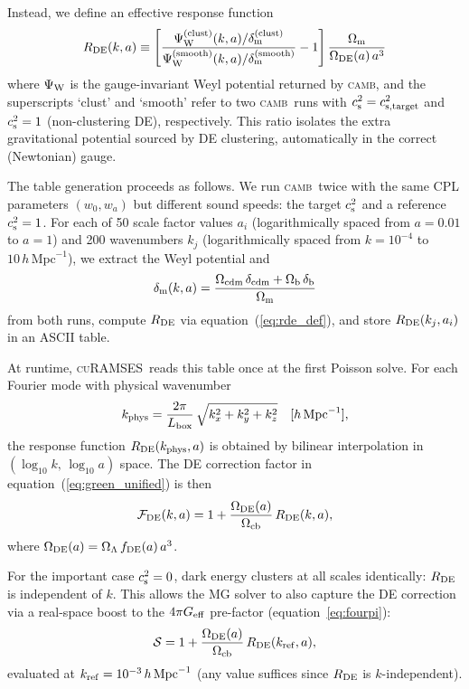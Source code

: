 \documentclass[fleqn,usenatbib]{mnras}
\newcommand{\curamses}{\textsc{cuRAMSES}}
\newcommand{\camb}{\textsc{camb}}
\newcommand{\Ocb}{\Omega_{\rm cb}}
\newcommand{\Om}{\Omega_{\rm m}}
\newcommand{\Ol}{\Omega_\Lambda}
\newcommand{\Ode}{\Omega_{\rm DE}}
\newcommand{\Rde}{R_{\rm DE}}
\newcommand{\cst}{c_{\rm s}^2}
\begin{document}
Instead, we define an effective response function
\begin{equation}
\Rde(k,a) \equiv \left[
  \frac{\Psi_{\rm W}^{(\rm clust)}(k,a) / \delta_{\rm m}^{(\rm clust)}}
       {\Psi_{\rm W}^{(\rm smooth)}(k,a) / \delta_{\rm m}^{(\rm smooth)}}
  - 1
\right]
\frac{\Om}{\Ode(a)\,a^3}
\label{eq:rde_def}
\end{equation}
where $\Psi_{\rm W}$ is the gauge-invariant Weyl potential returned by
\camb, and the superscripts `clust' and `smooth' refer to two \camb\
runs with $\cst = c_{\rm s,target}^2$ and $\cst = 1$ (non-clustering
DE), respectively.  This ratio isolates the extra gravitational
potential sourced by DE clustering, automatically in the correct
(Newtonian) gauge.

The table generation proceeds as follows.  We run \camb\ twice with
the same CPL parameters $(w_0, w_a)$ but different sound speeds:
the target $\cst$ and a reference $\cst=1$.  For each of 50 scale
factor values $a_i$ (logarithmically spaced from $a=0.01$ to $a=1$)
and 200 wavenumbers $k_j$ (logarithmically spaced from $k=10^{-4}$
to $10\,h\,\mathrm{Mpc}^{-1}$), we extract the Weyl potential and
\begin{equation}
\delta_{\rm m}(k,a) = \frac{\Omega_{\rm cdm}\,\delta_{\rm cdm}
  + \Omega_{\rm b}\,\delta_{\rm b}}{\Om}
\label{eq:delta_m}
\end{equation}
from both runs, compute $\Rde$ via equation~(\ref{eq:rde_def}), and
store $\Rde(k_j, a_i)$ in an ASCII table.

At runtime, \curamses\ reads this table once at the first Poisson
solve.  For each Fourier mode with physical wavenumber
\begin{equation}
k_{\rm phys} = \frac{2\pi}{L_{\rm box}}\,
\sqrt{k_x^2 + k_y^2 + k_z^2}
\quad [h\,\mathrm{Mpc}^{-1}],
\label{eq:kphys}
\end{equation}
the response function $\Rde(k_{\rm phys}, a)$ is obtained by bilinear
interpolation in $(\log_{10}k,\,\log_{10}a)$ space.  The DE correction
factor in equation~(\ref{eq:green_unified}) is then
\begin{equation}
\mathcal{F}_{\rm DE}(k,a)
  = 1 + \frac{\Ode(a)}{\Ocb}\,\Rde(k,a),
\label{eq:de_factor}
\end{equation}
where $\Ode(a) = \Ol\,f_{\rm DE}(a)\,a^3$.

For the important case $\cst = 0$, dark energy clusters at all scales
identically: $\Rde$ is independent of $k$.  This allows the MG solver
to also capture the DE correction via a real-space boost to the
$4\pi G_{\rm eff}$ pre-factor (equation~\ref{eq:fourpi}):
\begin{equation}
\mathcal{S} = 1 + \frac{\Ode(a)}{\Ocb}\,\Rde(k_{\rm ref},a),
\label{eq:fourpi_boost}
\end{equation}
evaluated at $k_{\rm ref} = 10^{-3}\,h\,\mathrm{Mpc}^{-1}$ (any
value suffices since $\Rde$ is $k$-independent).
\end{document}
